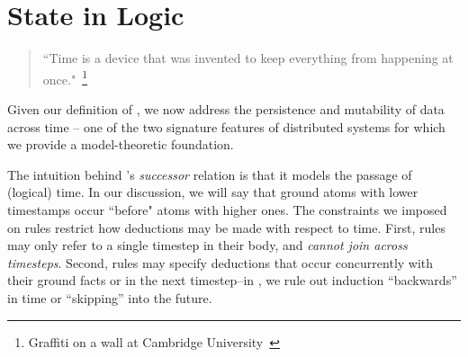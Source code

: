\section{State in Logic}





\begin{quote}
%
``Time is a device that was invented to keep everything from
happening at once."~\footnote{Graffiti on a wall at Cambridge
University~\cite{scheme}}
%
\end{quote} 

Given our definition of \slang, we now address the persistence and mutability
of data across time -- one of the two signature features of distributed systems
for which we provide a model-theoretic foundation.

The intuition behind \slang's \emph{successor} relation is that it models the
passage of (logical) time.  In our discussion, we will say that ground atoms
with lower timestamps occur ``before" atoms with higher ones.
The constraints we imposed on \slang rules restrict how deductions may be made
with respect to time.  First, rules may only refer to a single timestep in
their body, and {\em cannot join across timesteps}.  Second, rules may specify
deductions that occur concurrently with their ground facts or in the next
timestep--in \slang, we rule out induction ``backwards'' in time or
``skipping'' into the future.

